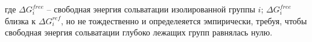 где $\Delta G_i^{free}$ -- свободная энергия сольватации изолированной группы $i$; $\Delta G_i^{free}$ близка к $\Delta G_i^{ref}$, но не тождественно и определеяется эмпирически, требуя, чтобы свободная энергия сольватации глубоко лежащих групп равнялась нулю.









